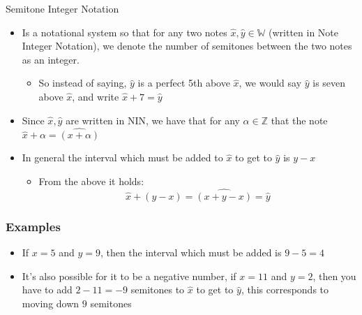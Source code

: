 \documentclass[preview]{standalone}
\begin{document}
\begin{defn*}{Semitone Integer Notation}
  \begin{itemize}
    \item Is a notational system so that for any two notes $\widehat{x}, \widehat{y} \in \mathbb{W}$ (written in Note Integer Notation), we denote the number of semitones between the two notes as an integer. 
      \begin{itemize}
        \item So instead of saying, $\widehat{y}$ is a perfect 5th above $\widehat{x}$, we would say $\widehat{y}$ is seven above $\widehat{x}$, and write $\widehat{x}  +  7 = \widehat{y}$ 
      \end{itemize}
  \item Since $\widehat{x}, \widehat{y}$ are written in NIN, we have that for any $\alpha \in \mathbb{Z}$ that the note $\widehat{x}  +  \alpha = \widehat{\left( x  +  \alpha \right)}$ 
    \item In general the interval which must be added to $\widehat{x}$ to get to $\widehat{y}$ is $y - x$ 
      \begin{itemize}
        \item From the above it holds: 
          \[
            \widehat{x}  +  \left( y  -  x \right) = \widehat{\left( x  +  y  - x \right)} = \widehat{y}
          \]
      \end{itemize}
  \end{itemize}
    \subsubsection*{Examples}
    \begin{itemize}
      \item If $x = 5$ and $y = 9$, then the interval which must be added is $9 - 5 = 4$ 
      \item It's also possible for it to be a negative number, if $x = 11$ and $y = 2$, then you have to add $2  -  11 = -9$ semitones to $\widehat{x}$ to get to $\widehat{y}$, this corresponds to moving down $9$ semitones
    \end{itemize}

\end{defn*}
\end{document}
